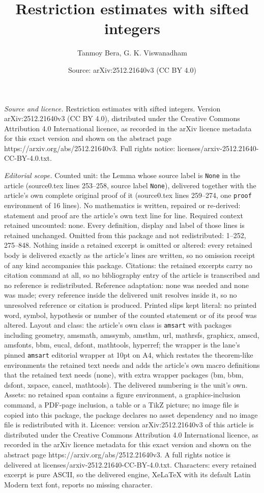 \documentclass[10pt,a4paper]{amsart}
\title[Restriction estimates with sifted integers]{Restriction estimates with sifted integers}
\author{Tanmoy Bera, G. K. Viswanadham}
\date{Source: arXiv:2512.21640v3 (CC BY 4.0)}
\begin{document}
\maketitle

\noindent\emph{Source and licence.} Restriction estimates with sifted integers. Version arXiv:2512.21640v3 (CC BY 4.0), distributed under the Creative Commons Attribution 4.0 International licence, as recorded in the arXiv licence metadata for this exact version and shown on the abstract page https://arxiv.org/abs/2512.21640v3. Full rights notice: licenses/arxiv-2512.21640-CC-BY-4.0.txt.\par\smallskip

\noindent\textit{Editorial scope.} Counted unit: the Lemma whose source label is \texttt{None} in the article (source0.tex lines 253--258, source label \texttt{None}), delivered together with the article's own complete original proof of it (source0.tex lines 259--274, one \texttt{proof} environment of 16 lines). No mathematics is written, repaired or re-derived: statement and proof are the article's own text line for line. Required context retained uncounted: none. Every definition, display and label of those lines is retained unchanged. Omitted from this package and not redistributed: 1--252, 275--848. Nothing inside a retained excerpt is omitted or altered: every retained body is delivered exactly as the article's lines are written, so no omission receipt of any kind accompanies this package. Citations: the retained excerpts carry no citation command at all, so no bibliography entry of the article is transcribed and no reference is redistributed. Reference adaptation: none was needed and none was made; every reference inside the delivered unit resolves inside it, so no unresolved reference or citation is produced. Printed slips kept literal: no printed word, symbol, hypothesis or number of the counted statement or of its proof was altered. Layout and class: the article's own class is \texttt{amsart} with packages including geometry, amsmath, amssymb, amsthm, url, mathrsfs, graphicx, amscd, amsfonts, bbm, eucal, dsfont, mathtools, hyperref; the wrapper is the lane's pinned \texttt{amsart} editorial wrapper at 10pt on A4, which restates the theorem-like environments the retained text needs and adds the article's own macro definitions that the retained text needs (none), with extra wrapper packages (bm, bbm, dsfont, xspace, cancel, mathtools). The delivered numbering is the unit's own. Assets: no retained span contains a figure environment, a graphics-inclusion command, a PDF-page inclusion, a table or a TikZ picture; no image file is copied into this package, the package declares no asset dependency and no image file is redistributed with it. Licence: version arXiv:2512.21640v3 of this article is distributed under the Creative Commons Attribution 4.0 International licence, as recorded in the arXiv licence metadata for this exact version and shown on the abstract page https://arxiv.org/abs/2512.21640v3. A full rights notice is delivered at licenses/arxiv-2512.21640-CC-BY-4.0.txt. Characters: every retained excerpt is pure ASCII, so the delivered engine, XeLaTeX with its default Latin Modern text font, reports no missing character.
\end{document}
